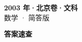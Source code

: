 \documentclass[zihao=-4, a4paper]{ctexart}
\begin{document}
\begin{center}
  {\Large\bfseries 2003 年·北京卷·文科}\\[4pt]
  {\large 数学 · 简答版}
\end{center}
\medskip
{}

\clearpage
{}
\begin{center}{\Large\bfseries 答案速查}\end{center}
\medskip

\end{document}
